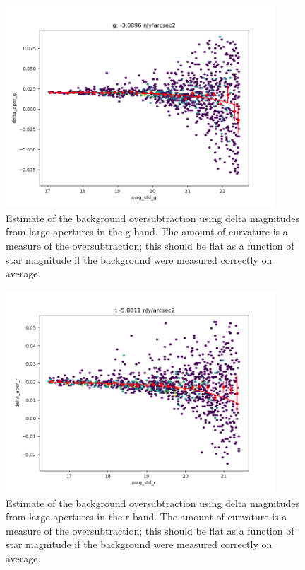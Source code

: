 \begin{figure}
  \begin{center}
    \includegraphics[width=0.9\textwidth]{photometric_calibration_figures/background_oversubtraction_g.png}
  \end{center}
  \caption{Estimate of the background oversubtraction using delta magnitudes
    from large apertures in the g band.  The amount of curvature is a measure
    of the oversubtraction; this should be flat as a function of star magnitude
    if the background were measured correctly on average.}
\end{figure}

\begin{figure}
  \begin{center}
    \includegraphics[width=0.9\textwidth]{photometric_calibration_figures/background_oversubtraction_r.png}
  \end{center}
  \caption{Estimate of the background oversubtraction using delta magnitudes
    from large apertures in the r band.  The amount of curvature is a measure
    of the oversubtraction; this should be flat as a function of star magnitude
    if the background were measured correctly on average.}
\end{figure}

